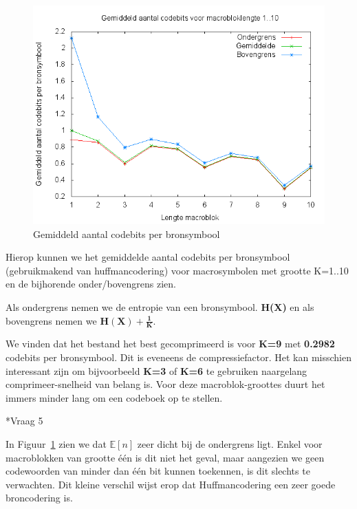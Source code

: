 \documentclass[]{article}
\begin{document}
\begin{section}
\begin{subsection}
        \begin{figure}[h]
            \centering
            \includegraphics[width=\textwidth]{vraag1_4.png}
            \caption{Gemiddeld aantal codebits per bronsymbool}
            \label{fig:codebits}
        \end{figure}

        Hierop kunnen we het gemiddelde aantal codebits per bronsymbool
        (gebruikmakend van huffmancodering) voor macrosymbolen met
        grootte K=1..10 en de bijhorende onder/bovengrens zien.

        Als ondergrens nemen we de entropie van een bronsymbool.
        \textbf{H(X)} en als bovengrens nemen we
        $\mathbf{H(X) +\frac{1}{K}}$.

        We vinden dat het bestand het best gecomprimeerd is voor
        \textbf{K=9} met \textbf{0.2982} codebits per bronsymbool. Dit
        is eveneens de compressiefactor. Het kan misschien  interessant
        zijn om bijvoorbeeld \textbf{K=3} of \textbf{K=6} te gebruiken
        naargelang comprimeer-snelheid van belang is. Voor deze
        macroblok-groottes duurt het immers minder lang om een codeboek
        op te stellen.
		
    \end{subsection}

    \begin{subsection}*{Vraag 5}

        In Figuur~\ref{fig:codebits} zien we dat $\mathbb{E}[n]$ zeer
        dicht bij de ondergrens ligt. Enkel voor macroblokken van
        grootte \'e\'en is dit niet het geval, maar aangezien we geen
        codewoorden van minder dan \'e\'en bit kunnen toekennen, is dit
        slechts te verwachten. Dit kleine verschil wijst erop dat
        Huffmancodering een zeer goede broncodering is.


\end{subsection}
\end{section}
\end{document}
